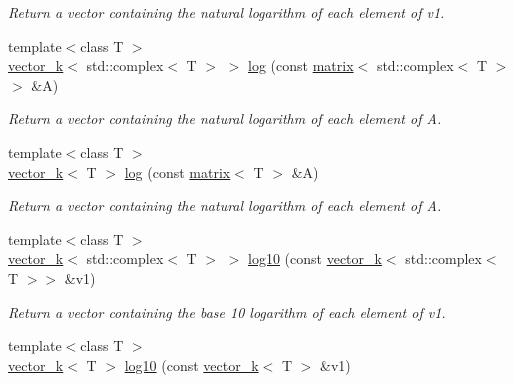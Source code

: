 \begin{DoxyCompactItemize}
\begin{DoxyCompactList}\small\item\em Return a vector containing the natural logarithm of each element of v1. \end{DoxyCompactList}\item 
\hypertarget{namespacekeycpp_a68ebe3cd64dbf2c0d09f33f5e7951317}{{\footnotesize template$<$class T $>$ }\\\hyperlink{classkeycpp_1_1vector__k}{vector\-\_\-k}$<$ std\-::complex$<$ T $>$ $>$ \hyperlink{namespacekeycpp_a68ebe3cd64dbf2c0d09f33f5e7951317}{log} (const \hyperlink{classkeycpp_1_1matrix}{matrix}$<$ std\-::complex$<$ T $>$$>$ \&A)}\label{namespacekeycpp_a68ebe3cd64dbf2c0d09f33f5e7951317}

\begin{DoxyCompactList}\small\item\em Return a vector containing the natural logarithm of each element of A. \end{DoxyCompactList}\item 
\hypertarget{namespacekeycpp_ab18fc1ec8072b5fdfd260346c66b2301}{{\footnotesize template$<$class T $>$ }\\\hyperlink{classkeycpp_1_1vector__k}{vector\-\_\-k}$<$ T $>$ \hyperlink{namespacekeycpp_ab18fc1ec8072b5fdfd260346c66b2301}{log} (const \hyperlink{classkeycpp_1_1matrix}{matrix}$<$ T $>$ \&A)}\label{namespacekeycpp_ab18fc1ec8072b5fdfd260346c66b2301}

\begin{DoxyCompactList}\small\item\em Return a vector containing the natural logarithm of each element of A. \end{DoxyCompactList}\item 
\hypertarget{namespacekeycpp_a9364d5d2e2a67359845a437550963985}{{\footnotesize template$<$class T $>$ }\\\hyperlink{classkeycpp_1_1vector__k}{vector\-\_\-k}$<$ std\-::complex$<$ T $>$ $>$ \hyperlink{namespacekeycpp_a9364d5d2e2a67359845a437550963985}{log10} (const \hyperlink{classkeycpp_1_1vector__k}{vector\-\_\-k}$<$ std\-::complex$<$ T $>$$>$ \&v1)}\label{namespacekeycpp_a9364d5d2e2a67359845a437550963985}

\begin{DoxyCompactList}\small\item\em Return a vector containing the base 10 logarithm of each element of v1. \end{DoxyCompactList}\item 
\hypertarget{namespacekeycpp_a506e11389a9ed0bfbd27f41a75df0719}{{\footnotesize template$<$class T $>$ }\\\hyperlink{classkeycpp_1_1vector__k}{vector\-\_\-k}$<$ T $>$ \hyperlink{namespacekeycpp_a506e11389a9ed0bfbd27f41a75df0719}{log10} (const \hyperlink{classkeycpp_1_1vector__k}{vector\-\_\-k}$<$ T $>$ \&v1)}\label{namespacekeycpp_a506e11389a9ed0bfbd27f41a75df0719}


\end{DoxyCompactItemize}
